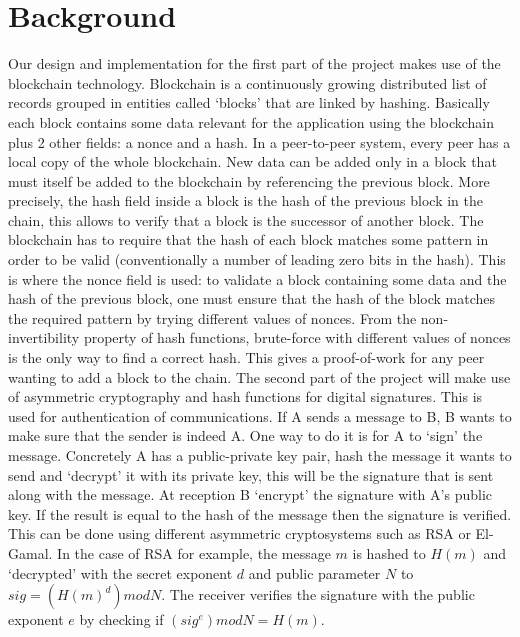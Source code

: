 \documentclass[twocolumn]{article}
\begin{document}
\section{Background}
Our design and implementation for the first part of the project makes use of the blockchain technology. Blockchain is a continuously growing distributed list of records grouped in entities called ‘blocks’ that are linked by hashing. Basically each block contains some data relevant for the application using the blockchain plus 2 other fields: a nonce and a hash. In a peer-to-peer system, every peer has a local copy  of the whole blockchain. New data can be added only in a block that must itself be added to the blockchain by referencing the previous block.
More precisely, the hash field inside a block is the hash of the previous block in the chain, this allows to verify that a block is the successor of another block. The blockchain has to require that the hash of each block matches some pattern in order to be valid (conventionally a number of leading zero bits in the hash).
This is where the nonce field is used: to validate a block containing some data and the hash of the previous block, one must ensure that the hash of the block matches the required pattern by trying different values of nonces. From the non-invertibility property of hash functions, brute-force with different values of nonces is the only way to find a correct hash. This gives a proof-of-work for any peer wanting to add a block to the chain.
\linebreak
\linebreak
The second part of the project will make use of asymmetric cryptography and hash functions for digital signatures. This is used for authentication of communications. If A sends a message to B, B wants to make sure that the sender is indeed A. One way to do it is for A to ‘sign’ the message.
Concretely A has a public-private key pair, hash the message it wants to send and ‘decrypt’ it with its private key, this will be the signature that is sent along with the message. At reception B ‘encrypt’ the signature with A’s public key. If the result is equal to the hash of the message then the signature is verified. This can be done using different asymmetric cryptosystems such as RSA or El-Gamal.
In the case of RSA for example, the message $m$ is hashed to $H(m)$ and ‘decrypted’ with the secret exponent $d$ and public parameter $N$ to $sig = (H(m)^d) mod N$. The receiver verifies the signature with the public exponent $e$ by checking if $(sig^e) mod N = H(m)$.
\end{document}
